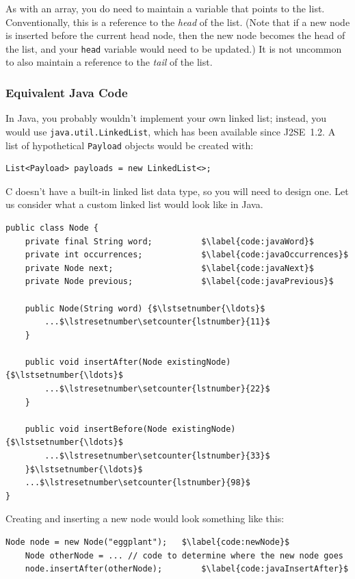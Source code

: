 As with an array, you do need to maintain a variable that points to the list.
Conventionally, this is a reference to the \textit{head} of the list. (Note
that if a new node is inserted before the current head node, then the new node
becomes the head of the list, and your \lstinline{head} variable would need to
be updated.) It is not uncommon to also maintain a reference to the
\textit{tail} of the list.

\subsubsection{Equivalent Java Code}

In Java, you probably wouldn't implement your own linked list; instead, you
would use \lstinline{java.util.LinkedList}, which has been available since
J2SE~1.2. A list of hypothetical \lstinline{Payload} objects would be created
with:
\begin{lstlisting}[numbers=none]
    List<Payload> payloads = new LinkedList<>;
\end{lstlisting}

C doesn't have a built-in linked list data type, so you will need to design
one. Let us consider what a custom linked list would look like in Java.

\begin{lstlisting}[mathescape=true]
public class Node {
    private final String word;          $\label{code:javaWord}$
    private int occurrences;            $\label{code:javaOccurrences}$
    private Node next;                  $\label{code:javaNext}$
    private Node previous;              $\label{code:javaPrevious}$

    public Node(String word) {$\lstsetnumber{\ldots}$
        ...$\lstresetnumber\setcounter{lstnumber}{11}$
    }

    public void insertAfter(Node existingNode) {$\lstsetnumber{\ldots}$
        ...$\lstresetnumber\setcounter{lstnumber}{22}$
    }

    public void insertBefore(Node existingNode) {$\lstsetnumber{\ldots}$
        ...$\lstresetnumber\setcounter{lstnumber}{33}$
    }$\lstsetnumber{\ldots}$
    ...$\lstresetnumber\setcounter{lstnumber}{98}$
}
\end{lstlisting}

Creating and inserting a new node would look something like this:

\begin{lstlisting}[firstnumber=200, mathescape=true]
    Node node = new Node("eggplant");   $\label{code:newNode}$
    Node otherNode = ... // code to determine where the new node goes
    node.insertAfter(otherNode);        $\label{code:javaInsertAfter}$
\end{lstlisting}

